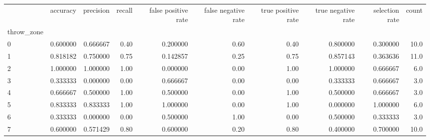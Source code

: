 \begin{tabular}{lrrrrrrrrr}
\toprule
{} &  accuracy &  precision &  recall &  false positive rate &  false negative rate &  true positive rate &  true negative rate &  selection rate &  count \\
throw\_zone &           &            &         &                      &                      &                     &                     &                 &        \\
\midrule
0          &  0.600000 &   0.666667 &    0.40 &             0.200000 &                 0.60 &                0.40 &            0.800000 &        0.300000 &   10.0 \\
1          &  0.818182 &   0.750000 &    0.75 &             0.142857 &                 0.25 &                0.75 &            0.857143 &        0.363636 &   11.0 \\
2          &  1.000000 &   1.000000 &    1.00 &             0.000000 &                 0.00 &                1.00 &            1.000000 &        0.666667 &    6.0 \\
3          &  0.333333 &   0.000000 &    0.00 &             0.666667 &                 0.00 &                0.00 &            0.333333 &        0.666667 &    3.0 \\
4          &  0.666667 &   0.500000 &    1.00 &             0.500000 &                 0.00 &                1.00 &            0.500000 &        0.666667 &    3.0 \\
5          &  0.833333 &   0.833333 &    1.00 &             1.000000 &                 0.00 &                1.00 &            0.000000 &        1.000000 &    6.0 \\
6          &  0.333333 &   0.000000 &    0.00 &             0.500000 &                 1.00 &                0.00 &            0.500000 &        0.333333 &    3.0 \\
7          &  0.600000 &   0.571429 &    0.80 &             0.600000 &                 0.20 &                0.80 &            0.400000 &        0.700000 &   10.0 \\
\bottomrule
\end{tabular}
